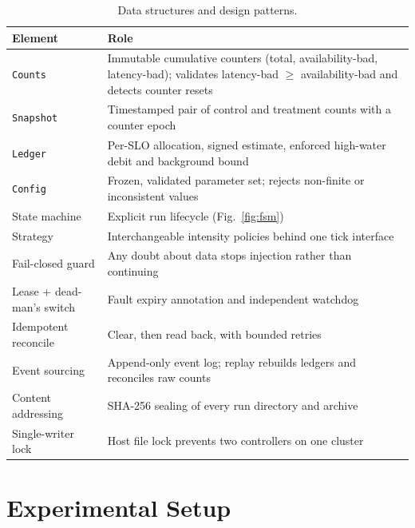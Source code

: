 \documentclass[a4paper,fleqn,11pt]{cas-dc}
\begin{document}
\begin{table}[width=.95\linewidth,cols=2,pos=t]
\caption{Data structures and design patterns.}\label{tbl:design}
\footnotesize
\begin{tabular*}{\tblwidth}{@{}L{2.2cm}L{5.1cm}@{}}
\toprule
Element & Role \\
\midrule
\texttt{Counts} & Immutable cumulative counters (total, availability-bad, latency-bad); validates latency-bad $\geq$ availability-bad and detects counter resets \\
\texttt{Snapshot} & Timestamped pair of control and treatment counts with a counter epoch \\
\texttt{Ledger} & Per-SLO allocation, signed estimate, enforced high-water debit and background bound \\
\texttt{Config} & Frozen, validated parameter set; rejects non-finite or inconsistent values \\
State machine & Explicit run lifecycle (Fig.~\ref{fig:fsm}) \\
Strategy & Interchangeable intensity policies behind one tick interface \\
Fail-closed guard & Any doubt about data stops injection rather than continuing \\
Lease + dead-man's switch & Fault expiry annotation and independent watchdog \\
Idempotent reconcile & Clear, then read back, with bounded retries \\
Event sourcing & Append-only event log; replay rebuilds ledgers and reconciles raw counts \\
Content addressing & SHA-256 sealing of every run directory and archive \\
Single-writer lock & Host file lock prevents two controllers on one cluster \\
\bottomrule
\end{tabular*}
\end{table}

\FloatBarrier

\section{Experimental Setup}\label{sec:impl}
\end{document}
